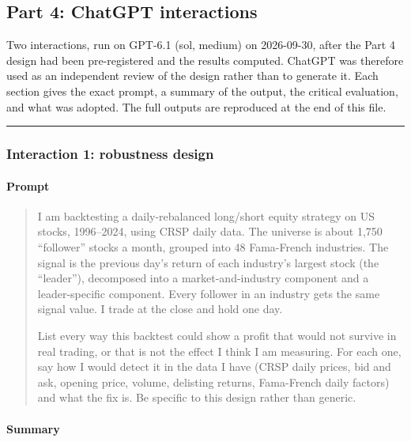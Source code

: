 \hypertarget{part-4-chatgpt-interactions}{%
\subsection{Part 4: ChatGPT interactions}\label{part-4-chatgpt-interactions}}

Two interactions, run on GPT-6.1 (sol, medium) on 2026-09-30, after the Part 4 design had
been pre-registered and the results computed. ChatGPT was therefore used as an
independent review of the design rather than to generate it. Each section gives the
exact prompt, a summary of the output, the critical evaluation, and what was adopted.
The full outputs are reproduced at the end of this file.

\begin{center}\rule{0.5\linewidth}{0.5pt}\end{center}

\hypertarget{interaction-1-robustness-design}{%
\subsubsection{Interaction 1: robustness design}\label{interaction-1-robustness-design}}

\hypertarget{prompt}{%
\paragraph{Prompt}\label{prompt}}

\begin{quote}
I am backtesting a daily-rebalanced long/short equity strategy on US stocks, 1996--2024,
using CRSP daily data. The universe is about 1,750 ``follower'' stocks a month, grouped
into 48 Fama-French industries. The signal is the previous day's return of each
industry's largest stock (the ``leader''), decomposed into a market-and-industry
component and a leader-specific component. Every follower in an industry gets the
same signal value. I trade at the close and hold one day.

List every way this backtest could show a profit that would not survive in real
trading, or that is not the effect I think I am measuring. For each one, say how I
would detect it in the data I have (CRSP daily prices, bid and ask, opening price,
volume, delisting returns, Fama-French daily factors) and what the fix is. Be
specific to this design rather than generic.
\end{quote}

\hypertarget{summary}{%
\paragraph{Summary}\label{summary}}

